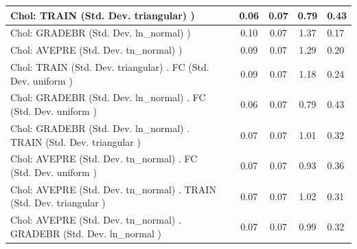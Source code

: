 \begin{table}
\begin{center}
\begin{tabular}{|l|l|c|c|c|l|}
			\hline
			 Chol: TRAIN (Std. Dev. triangular) ) &  & 0.06 & 0.07 & 0.79 & 0.43 \\
			\hline
			 Chol: GRADEBR (Std. Dev. ln_normal) ) &  & 0.10 & 0.07 & 1.37 & 0.17 \\
			\hline
			 Chol: AVEPRE (Std. Dev. tn_normal) ) &  & 0.09 & 0.07 & 1.29 & 0.20 \\
			\hline
			 Chol: TRAIN (Std. Dev. triangular) . FC (Std. Dev.   uniform ) &  & 0.09 & 0.07 & 1.18 & 0.24 \\
			\hline
			 Chol: GRADEBR (Std. Dev. ln_normal) . FC (Std. Dev.   uniform ) &  & 0.06 & 0.07 & 0.79 & 0.43 \\
			\hline
			 Chol: GRADEBR (Std. Dev. ln_normal) . TRAIN (Std. Dev.   triangular ) &  & 0.07 & 0.07 & 1.01 & 0.32 \\
			\hline
			 Chol: AVEPRE (Std. Dev. tn_normal) . FC (Std. Dev.   uniform ) &  & 0.07 & 0.07 & 0.93 & 0.36 \\
			\hline
			 Chol: AVEPRE (Std. Dev. tn_normal) . TRAIN (Std. Dev.   triangular ) &  & 0.07 & 0.07 & 1.02 & 0.31 \\
			\hline
			 Chol: AVEPRE (Std. Dev. tn_normal) . GRADEBR (Std. Dev.   ln_normal ) &  & 0.07 & 0.07 & 0.99 & 0.32 \\
			\hline
		\end{tabular}
	\end{center}
\end{table}